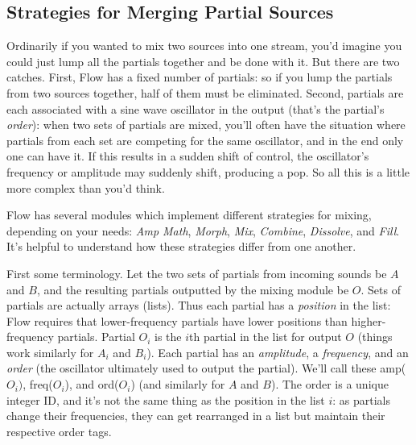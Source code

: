 \documentclass{article}
\newcommand\name{Flow}
\begin{document}
\subsection{Strategies for Merging Partial Sources}
\label{mixingstrategies}

Ordinarily if you wanted to mix two sources into one stream, you'd imagine you could just lump all the partials together and be done with it.  But there are two catches.  First, {\name} has a fixed number of partials: so if you lump the partials from two sources together, half of them must be eliminated.  Second, partials are each associated with a sine wave oscillator in the output (that's the partial's {\it order}): when two sets of partials are mixed, you'll often have the situation where partials from each set are competing for the same oscillator, and in the end only one can have it.   If this results in a sudden shift of control, the oscillator's frequency or amplitude may suddenly shift, producing a pop. So all this is a little more complex than you'd think.

{\name} has several modules which implement different strategies for mixing, depending on your needs: {\it Amp Math}, {\it Morph}, {\it Mix}, {\it Combine}, {\it Dissolve}, and {\it Fill}. It's helpful to understand how these strategies differ from one another.

First some terminology.  Let the two sets of partials from incoming sounds be \(A\) and \(B\), and the resulting partials outputted by the mixing module be \(O\).   Sets of partials are actually arrays (lists).  Thus each partial has a {\it position} in the list: {\name} requires that lower-frequency partials have lower positions than higher-frequency partials.  Partial \(O_i\) is the \(i\)th partial in the list for output \(O\) (things work similarly for \(A_i\) and \(B_i\)).  Each partial has an {\it amplitude}, a {\it frequency}, and an {\it order} (the oscillator ultimately used to output the partial).  We'll call these amp(\(O_i)\), freq(\(O_i\)), and ord(\(O_i\)) (and similarly for \(A\) and \(B\)).  The order is a unique integer ID, and it's not the same thing as the position in the list \(i\): as partials change their frequencies, they can get rearranged in a list but maintain their respective order tags.
\end{document}

